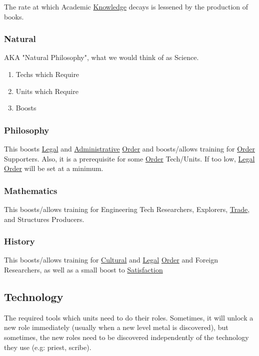 \documentclass[11pt]{article}
\begin{document}
The rate at which Academic \hyperref[orgd7203c2]{Knowledge} decays is lessened by the production of books.\\
\subsubsection{Natural}
\label{sec:orgcceb10c}
AKA "Natural Philosophy", what we would think of as Science.\\
\begin{enumerate}
\item Techs which Require
\label{sec:org13400a9}
\item Units which Require
\label{sec:orge1ed0a1}
\item Boosts
\label{sec:org5c5752c}
\end{enumerate}
\subsubsection{Philosophy}
\label{sec:org5f9b996}
This boosts \hyperref[org39099d7]{Legal} and \hyperref[org6e4ede0]{Administrative} \hyperref[orgd146db7]{Order} and boosts/allows training for \hyperref[orgd146db7]{Order} Supporters. Also, it is a prerequisite for some \hyperref[orgd146db7]{Order} Tech/Units. If too low, \hyperref[org39099d7]{Legal} \hyperref[orgd146db7]{Order} will be set at a minimum.\\
\subsubsection{Mathematics}
\label{sec:org2b908b3}
This boosts/allows training for Engineering Tech Researchers, Explorers, \hyperref[orgdbeaa2d]{Trade}, and Structures Producers.\\
\subsubsection{History}
\label{sec:orga1859c5}
This boosts/allows training for \hyperref[org992a868]{Cultural} and \hyperref[org39099d7]{Legal} \hyperref[orgd146db7]{Order} and Foreign Researchers, as well as a small boost to \hyperref[orgda5f73b]{Satisfaction}\\
\subsection{Technology \label{org85e435a} \label{org7bb99d3}}
\label{sec:org03cb885}
The required tools which units need to do their roles. Sometimes, it will unlock a new role immediately (usually when a new level metal is discovered), but sometimes, the new roles need to be discovered independently of the technology they use (e.g: priest, scribe).\\
\end{document}
